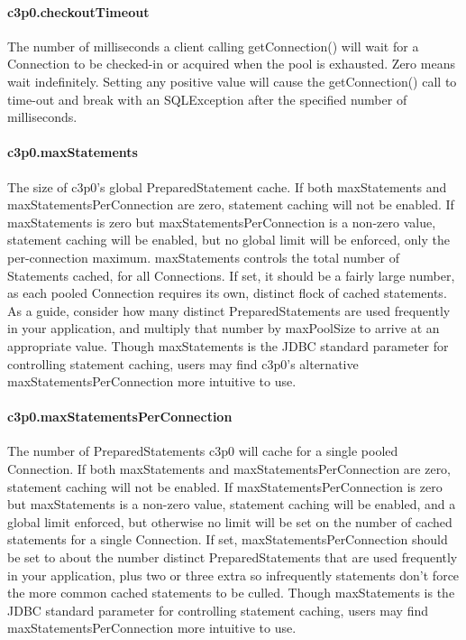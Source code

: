 \paragraph{c3p0.checkoutTimeout}
The number of milliseconds a client calling getConnection() will wait for a Connection
to be checked-in or acquired when the pool is exhausted. Zero means wait indefinitely.
Setting any positive value will cause the getConnection() call to time-out and
break with an SQLException after the specified number of milliseconds.

\paragraph{c3p0.maxStatements}
The size of c3p0's global PreparedStatement cache. If both maxStatements and
maxStatementsPerConnection are zero, statement caching will not be enabled.
If maxStatements is zero but maxStatementsPerConnection is a non-zero value,
statement caching will be enabled, but no global limit will be enforced, only
the per-connection maximum. maxStatements controls the total number of Statements
cached, for all Connections. If set, it should be a fairly large number, as each
pooled Connection requires its own, distinct flock of cached statements. As a guide,
consider how many distinct PreparedStatements are used frequently in your application,
and multiply that number by maxPoolSize to arrive at an appropriate value. Though
maxStatements is the JDBC standard parameter for controlling statement caching,
users may find c3p0's alternative maxStatementsPerConnection more intuitive to use.

\paragraph{c3p0.maxStatementsPerConnection}
The number of PreparedStatements c3p0 will cache for a single pooled Connection.
If both maxStatements and maxStatementsPerConnection are zero, statement caching
will not be enabled. If maxStatementsPerConnection is zero but maxStatements is
a non-zero value, statement caching will be enabled, and a global limit enforced,
but otherwise no limit will be set on the number of cached statements for a single
Connection. If set, maxStatementsPerConnection should be set to about the number
distinct PreparedStatements that are used frequently in your application, plus
two or three extra so infrequently statements don't force the more common cached
statements to be culled. Though maxStatements is the JDBC standard parameter for
controlling statement caching, users may find maxStatementsPerConnection more
intuitive to use.

